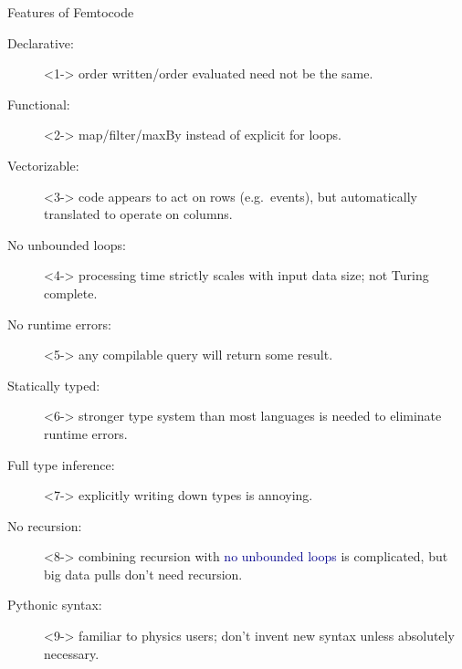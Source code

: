 \documentclass{beamer}
\begin{document}
\begin{frame}{Features of Femtocode}
\vspace{0.5 cm}
\begin{description}
\item[Declarative:]<1-> order written/order evaluated need not be the same.
\item[Functional:]<2-> map/filter/maxBy instead of explicit for loops.
\item[Vectorizable:]<3-> code appears to act on rows (e.g.\ events), but automatically translated to operate on columns.
\item[No unbounded loops:]<4-> processing time strictly scales with input data size; not Turing complete.
\item[No runtime errors:]<5-> any compilable query will return some result.
\item[Statically typed:]<6-> stronger type system than most languages is needed to eliminate runtime errors.
\item[Full type inference:]<7-> explicitly writing down types is annoying.
\item[No recursion:]<8-> combining recursion with \textcolor{darkblue}{no unbounded loops} is complicated, but big data pulls don't need recursion.
\item[Pythonic syntax:]<9-> familiar to physics users; don't invent new syntax unless absolutely necessary.
\end{description}
\end{frame}
\end{document}
